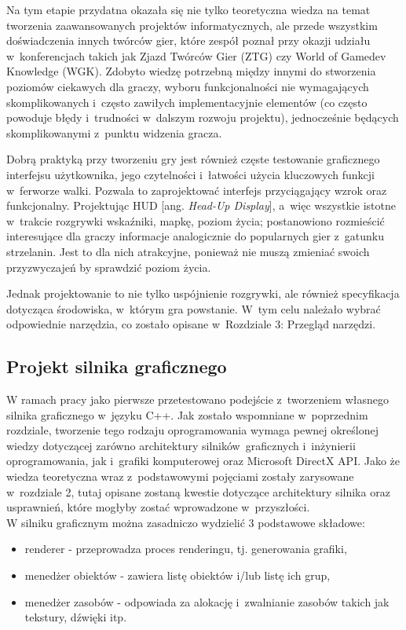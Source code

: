 Na tym etapie przydatna okazała się nie tylko teoretyczna wiedza na temat tworzenia zaawansowanych projektów informatycznych, ale przede wszystkim doświadczenia innych twórców gier, które zespół poznał przy okazji udziału w~konferencjach takich jak Zjazd Twórców Gier (ZTG) czy World of Gamedev Knowledge (WGK). Zdobyto wiedzę potrzebną między innymi do stworzenia poziomów ciekawych dla graczy, wyboru funkcjonalności nie wymagających skomplikowanych i~często zawiłych implementacyjnie elementów (co często powoduje błędy i~trudności w~dalszym rozwoju projektu), jednocześnie będących skomplikowanymi z~punktu widzenia gracza. 

Dobrą praktyką przy tworzeniu gry jest również częste testowanie graficznego interfejsu użytkownika, jego czytelności i~łatwości użycia kluczowych funkcji w~ferworze walki. Pozwala to zaprojektować interfejs przyciągający wzrok oraz funkcjonalny. Projektując HUD [ang. \emph{Head-Up Display}], a~więc wszystkie istotne w~trakcie rozgrywki wskaźniki, mapkę, poziom życia; postanowiono rozmieścić interesujące dla graczy informacje analogicznie do popularnych gier z~gatunku strzelanin. Jest to dla nich atrakcyjne, ponieważ nie muszą zmieniać swoich przyzwyczajeń by sprawdzić poziom życia. 

Jednak projektowanie to nie tylko uspójnienie rozgrywki, ale również specyfikacja dotycząca środowiska, w~którym gra powstanie. W~tym celu należało wybrać odpowiednie narzędzia, co zostało opisane w~Rozdziale 3: Przegląd narzędzi. 

\subsection{Projekt silnika graficznego}

W ramach pracy jako pierwsze przetestowano podejście z~tworzeniem własnego silnika graficznego w~języku C++. Jak zostało wspomniane w~poprzednim rozdziale, tworzenie tego rodzaju oprogramowania wymaga pewnej określonej wiedzy dotyczącej zarówno architektury silników~graficznych i~inżynierii oprogramowania, jak i~grafiki komputerowej oraz Microsoft DirectX API. Jako że wiedza teoretyczna wraz z~podstawowymi pojęciami zostały zarysowane w~rozdziale 2, tutaj opisane zostaną kwestie dotyczące architektury silnika oraz usprawnień, które mogłyby zostać wprowadzone w~przyszłości.\\

W silniku graficznym można zasadniczo wydzielić 3 podstawowe składowe:
\begin{itemize}
\item renderer - przeprowadza proces renderingu, tj. generowania grafiki,
\item menedżer obiektów - zawiera listę obiektów i/lub listę ich grup,
\item menedżer zasobów - odpowiada za alokację i~zwalnianie zasobów takich jak tekstury, dźwięki itp.
\end{itemize}

